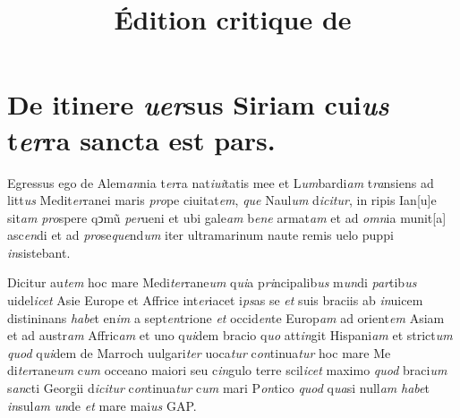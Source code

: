\documentclass[12pt, a4paper]{book}
\newcommand{\styleabbr}[1]{\textit{#1}}
\begin{document}
 \title{Édition critique de} \maketitle		
			\beginnumbering
			
	
	
	
		
			
				
			
			
\chapter{ De itinere \styleabbr{uer}sus Siriam cui\styleabbr{us}
t\styleabbr{er}ra sancta est pars. }
				
	\pstart
	
Egressus ego de Alem\styleabbr{an}nia t\styleabbr{er}ra
nat\styleabbr{iui}tatis mee et
L\styleabbr{um}bardi\styleabbr{am} t\styleabbr{ra}nsiens ad
litt\styleabbr{us} Medit\styleabbr{er}ranei maris
\styleabbr{pro}pe ciuitat\styleabbr{em}, \styleabbr{que}
Naul\styleabbr{um} d\styleabbr{icitur}, in ripis Ian[u]e
sit\styleabbr{am} \styleabbr{pro}spere qↄmũ \styleabbr{per}ueni
et ubi gale\styleabbr{am} b\styleabbr{ene} armat\styleabbr{am}
et ad \styleabbr{omn}ia munit[a] asc\styleabbr{en}di et ad
\styleabbr{pro}se\styleabbr{que}nd\styleabbr{um} iter
ultramarinum naute remis uelo puppi \styleabbr{in}sistebant.
				
	\pend
	
				
	\pstart
	
Dicitur au\styleabbr{tem} hoc mare
Medi\styleabbr{ter}rane\styleabbr{um} q\styleabbr{ui}a
p\styleabbr{ri}ncipalib\styleabbr{us} m\styleabbr{un}di
\styleabbr{par}tib\styleabbr{us} uidel\styleabbr{icet} Asie
Europe et Affrice int\styleabbr{er}iacet i\styleabbr{ps}as se
\styleabbr{et} suis braciis ab \styleabbr{in}uicem distininans
\styleabbr{habe}t en\styleabbr{im} a sept\styleabbr{en}trione
\styleabbr{et} occid\styleabbr{en}te Europ\styleabbr{am} ad
orient\styleabbr{em} Asiam et ad austr\styleabbr{am}
Affric\styleabbr{am} et uno q\styleabbr{ui}dem bracio
q\styleabbr{uo} att\styleabbr{in}git Hispani\styleabbr{am} et
strict\styleabbr{um} \styleabbr{quod} q\styleabbr{ui}dem de
Marroch uulgari\styleabbr{ter} uoca\styleabbr{tur}
c\styleabbr{on}tinua\styleabbr{tur} hoc mare Me
di\styleabbr{ter}rane\styleabbr{um} c\styleabbr{um} occeano
maiori seu c\styleabbr{in}gulo terre scil\styleabbr{icet} maximo
\styleabbr{quod} braci\styleabbr{um} s\styleabbr{an}cti Georgii
d\styleabbr{icitur} c\styleabbr{on}tinua\styleabbr{tur}
c\styleabbr{um} mari P\styleabbr{on}tico \styleabbr{quod}
q\styleabbr{ua}si null\styleabbr{am} \styleabbr{habe}t
\styleabbr{in}sul\styleabbr{am} \styleabbr{un}de \styleabbr{et}
mare mai\styleabbr{us} GAP.
				
\end{document}
